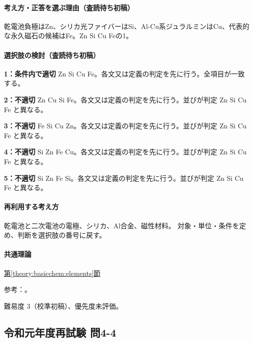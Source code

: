 \paragraph{考え方・正答を選ぶ理由（査読待ち初稿）} 乾電池負極はZn、シリカ光ファイバーはSi、Al-Cu系ジュラルミンはCu、代表的な永久磁石の候補はFe。Zn Si Cu Feの1。

\paragraph{選択肢の検討（査読待ち初稿）}\mbox{}\par

\noindent\textbf{1：条件内で適切} Zn Si Cu Fe。各文又は定義の判定を先に行う。全項目が一致する。\par

\noindent\textbf{2：不適切} Zn Cu Si Fe。各文又は定義の判定を先に行う。並びが判定 Zn Si Cu Fe と異なる。\par

\noindent\textbf{3：不適切} Fe Si Cu Zn。各文又は定義の判定を先に行う。並びが判定 Zn Si Cu Fe と異なる。\par

\noindent\textbf{4：不適切} Si Zn Fe Cu。各文又は定義の判定を先に行う。並びが判定 Zn Si Cu Fe と異なる。\par

\noindent\textbf{5：不適切} Si Zn Fe Si。各文又は定義の判定を先に行う。並びが判定 Zn Si Cu Fe と異なる。\par

\paragraph{再利用する考え方} 乾電池と二次電池の電極、シリカ、Al合金、磁性材料。 対象・単位・条件を定め、判断を選択肢の番号に戻す。

\paragraph{共通理論} \hyperref[theory:basicchem:elements]{第\ref*{theory:basicchem:elements}節}

\par 参考：\cite{openstax_batteries,chem55_fiber,chem55_duralumin,openstax_magnetism}。

\par 難易度 3（校準初稿）、優先度未評価。

\subsection{令和元年度再試験 問4-4}
\label{q:r01-ret-basic-4-4}

